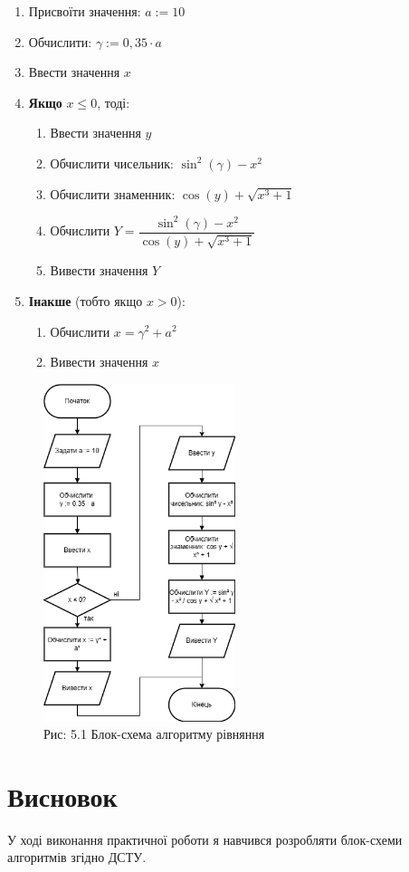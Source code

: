 \documentclass[a4paper]{article}
\begin{document}
\begin{enumerate}
    \item Присвоїти значення: $a := 10$
    \item Обчислити: $\gamma := 0{,}35 \cdot a$
    \item Ввести значення $x$
    \item \textbf{Якщо} $x \leq 0$, тоді:
    \begin{enumerate}
        \item Ввести значення $y$
        \item Обчислити чисельник: $\sin^2(\gamma) - x^2$
        \item Обчислити знаменник: $\cos(y) + \sqrt{x^3 + 1}$
\newpage
        \item Обчислити $Y = \dfrac{\sin^2(\gamma) - x^2}{\cos(y) + \sqrt{x^3 + 1}}$
        \item Вивести значення $Y$
    \end{enumerate}
    \item \textbf{Інакше} (тобто якщо $x > 0$):
    \begin{enumerate}
        \item Обчислити $x = \gamma^2 + a^2$
        \item Вивести значення $x$
    \end{enumerate}
\end{enumerate}


\begin{figure}[h]
    \centering
    \includegraphics[width=0.5\textwidth]{imgs/PW5.drawio.png}
    \caption*{Рис: 5.1 Блок-схема алгоритму рівняння}
\end{figure}

\section*{Висновок}
У ході виконання практичної роботи я навчився  розробляти блок-схеми алгоритмів згідно ДСТУ.
\end{document}
